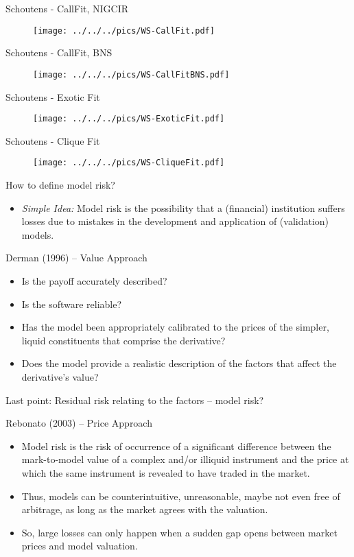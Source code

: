 {Schoutens - CallFit, NIGCIR}
\begin{figure}[htp]
\centering
\texttt{[image: ../../../pics/WS-CallFit.pdf]}
\end{figure}

{Schoutens - CallFit, BNS}
\begin{figure}[htp]
\centering
\texttt{[image: ../../../pics/WS-CallFitBNS.pdf]}
\end{figure}

{Schoutens - Exotic Fit}
\begin{figure}[htp]
\centering
\texttt{[image: ../../../pics/WS-ExoticFit.pdf]}
\end{figure}

{Schoutens - Clique Fit}
\begin{figure}[htp]
\centering
\texttt{[image: ../../../pics/WS-CliqueFit.pdf]}
\end{figure}

{How to define model risk?}
\begin{itemize}
\item {\it Simple Idea:} Model risk is the possibility that a (financial) institution suffers losses due to mistakes in the development and application of (validation) models.
\end{itemize}

{Derman (1996) -- Value Approach}
\begin{itemize}
\item Is the payoff accurately described?
\item Is the software reliable?
\item Has the model been appropriately calibrated to the prices of the simpler, liquid constituents that comprise the derivative?
\item Does the model provide a realistic description of the factors that affect the derivative's value?
\end{itemize}
Last point: Residual risk relating to the factors -- model risk?

{Rebonato (2003) -- Price Approach}

\begin{itemize}
\item<1-> Model risk is the risk of occurrence of a significant difference between the mark-to-model value of a complex and/or illiquid instrument and the price at which the same instrument is revealed to have traded in the market.
\item<2-> Thus, models can be counterintuitive, unreasonable, maybe not even free of arbitrage, as long as the market agrees with the valuation.
\item<3-> So, large losses  can only happen when a sudden gap opens between market prices and model valuation.
\end{itemize}

